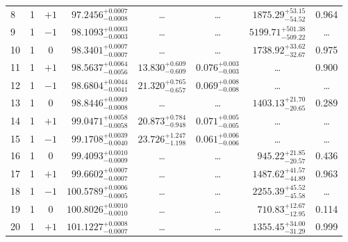 \begin{table*}[!]
\begin{tabular}{llcrrlrc}
8 & 1 & $+1$ & $     97.2456_{-      0.0008}^{+      0.0007}$ & \multicolumn{1}{c}{\dots} & \multicolumn{1}{c}{\dots} & $     1875.29_{-       54.52}^{+       53.15}$ & 0.964\\[1pt]
9 & 1 & $-1$ & $     98.1093_{-      0.0003}^{+      0.0003}$ & \multicolumn{1}{c}{\dots} & \multicolumn{1}{c}{\dots} & $     5199.71_{-      509.22}^{+      501.38}$ & \dots \\[1pt]
10 & 1 & 0 & $     98.3401_{-      0.0007}^{+      0.0007}$ & \multicolumn{1}{c}{\dots} & \multicolumn{1}{c}{\dots} & $     1738.92_{-       32.67}^{+       33.62}$ & 0.975\\[1pt]
11 & 1 & $+1$ & $     98.5637_{-      0.0056}^{+      0.0064}$ & $      13.830_{-       0.609}^{+       0.609}$ & $       0.076_{-       0.003}^{+       0.003}$ & \multicolumn{1}{c}{\dots} & 0.900\\[1pt]
12 & 1 & $-1$ & $     98.6804_{-      0.0041}^{+      0.0044}$ & $      21.320_{-       0.657}^{+       0.765}$ & $       0.069_{-       0.008}^{+       0.008}$ & \multicolumn{1}{c}{\dots} & \dots \\[1pt] 
13 & 1 & 0 & $     98.8446_{-      0.0008}^{+      0.0009}$ & \multicolumn{1}{c}{\dots} & \multicolumn{1}{c}{\dots} & $     1403.13_{-       20.65}^{+       21.70}$ & 0.289\\[1pt]
14 & 1 & $+1$ & $     99.0471_{-      0.0058}^{+      0.0058}$ & $      20.873_{-       0.948}^{+       0.784}$ & $       0.071_{-       0.005}^{+       0.005}$ & \multicolumn{1}{c}{\dots} & \dots \\[1pt]
15 & 1 & $-1$ & $     99.1708_{-      0.0040}^{+      0.0039}$ & $      23.726_{-       1.198}^{+       1.247}$ & $       0.061_{-       0.006}^{+       0.006}$ & \multicolumn{1}{c}{\dots} & \dots \\[1pt]
16 & 1 & 0 & $     99.4093_{-      0.0009}^{+      0.0010}$ & \multicolumn{1}{c}{\dots} & \multicolumn{1}{c}{\dots} & $      945.22_{-       20.57}^{+       21.85}$ & 0.436\\[1pt]
17 & 1 & $+1$ & $     99.6602_{-      0.0007}^{+      0.0007}$ & \multicolumn{1}{c}{\dots} & \multicolumn{1}{c}{\dots} & $     1487.62_{-       44.89}^{+       41.57}$ & 0.963\\[1pt]
18 & 1 & $-1$ & $    100.5789_{-      0.0005}^{+      0.0006}$ & \multicolumn{1}{c}{\dots} & \multicolumn{1}{c}{\dots} & $     2255.39_{-       45.58}^{+       45.52}$ & \dots \\[1pt]
19 & 1 & 0 & $    100.8026_{-      0.0010}^{+      0.0010}$ & \multicolumn{1}{c}{\dots} & \multicolumn{1}{c}{\dots} & $      710.83_{-       12.95}^{+       12.67}$ & 0.114\\[1pt]
20 & 1 & $+1$ & $    101.1227_{-      0.0007}^{+      0.0008}$ & \multicolumn{1}{c}{\dots} & \multicolumn{1}{c}{\dots} & $     1355.45_{-       31.29}^{+       34.00}$ & 0.999\\[1pt] 


\end{tabular}
\end{table*}
